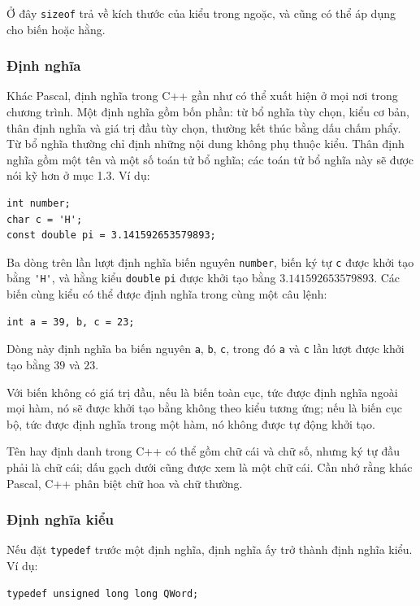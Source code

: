 \documentclass[11pt]{article}
\newcommand{\cpp}{C++}
\newcommand{\pascal}{Pascal}
\begin{document}
Ở đây \verb|sizeof| trả về kích thước của kiểu trong ngoặc, và cũng có thể áp
dụng cho biến hoặc hằng.

\subsubsection*{Định nghĩa}

Khác \pascal{}, định nghĩa trong \cpp{} gần như có thể xuất hiện ở mọi nơi
trong chương trình. Một định nghĩa gồm bốn phần: từ bổ nghĩa tùy chọn, kiểu cơ
bản, thân định nghĩa và giá trị đầu tùy chọn, thường kết thúc bằng dấu chấm
phẩy. Từ bổ nghĩa thường chỉ định những nội dung không phụ thuộc kiểu. Thân
định nghĩa gồm một tên và một số toán tử bổ nghĩa; các toán tử bổ nghĩa này sẽ
được nói kỹ hơn ở mục 1.3. Ví dụ:

\begin{verbatim}
int number;
char c = 'H';
const double pi = 3.141592653579893;
\end{verbatim}

Ba dòng trên lần lượt định nghĩa biến nguyên \verb|number|, biến ký tự
\verb|c| được khởi tạo bằng \verb|'H'|, và hằng kiểu \verb|double|
\verb|pi| được khởi tạo bằng \(3.141592653579893\). Các biến cùng kiểu có thể
được định nghĩa trong cùng một câu lệnh:

\begin{verbatim}
int a = 39, b, c = 23;
\end{verbatim}

Dòng này định nghĩa ba biến nguyên \verb|a|, \verb|b|, \verb|c|, trong đó
\verb|a| và \verb|c| lần lượt được khởi tạo bằng \(39\) và \(23\).

Với biến không có giá trị đầu, nếu là biến toàn cục, tức được định nghĩa ngoài
mọi hàm, nó sẽ được khởi tạo bằng không theo kiểu tương ứng; nếu là biến cục
bộ, tức được định nghĩa trong một hàm, nó không được tự động khởi tạo.

Tên hay định danh trong \cpp{} có thể gồm chữ cái và chữ số, nhưng ký tự đầu
phải là chữ cái; dấu gạch dưới cũng được xem là một chữ cái. Cần nhớ rằng
khác \pascal{}, \cpp{} phân biệt chữ hoa và chữ thường.

\subsubsection*{Định nghĩa kiểu}

Nếu đặt \verb|typedef| trước một định nghĩa, định nghĩa ấy trở thành định
nghĩa kiểu. Ví dụ:

\begin{verbatim}
typedef unsigned long long QWord;
\end{verbatim}
\end{document}
